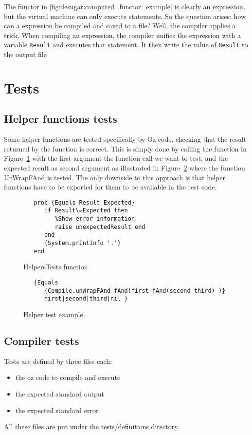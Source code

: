 \documentclass[a4paper]{memoir}
\begin{document}
The functor in \ref{fig:desugar:computed_functor_example} is clearly an
expression, but the virtual machine can only execute statements. So the question
arises: how can a expression be compiled and saved to a file? Well, the compiler 
applies a trick. When compiling an expression, the compiler unifies the
expression with a variable \lstinline!Result! and executes that statement.
It then write the value of \lstinline!Result! to the output file

\section{Tests}
\subsection{Helper functions tests}
Some helper functions are tested specifically by Oz code, checking that the result returned by the function is correct. This is simply done by calling the function in Figure~\ref{fig:helperstestsfunction} with the first argument the function call we want to test, and the expected result as second argument as illustrated in Figure~\ref{fig:helperstestsexample} where the function UnWrapFAnd is tested.
The only downside to this approach is that helper functions have to be exported for them to be available in the test code.

\begin{figure}
\begin{lstlisting}
   proc {Equals Result Expected}
      if Result\=Expected then
         %Show error information
         raise unexpectedResult end
      end
      {System.printInfo '.'}
   end
\end{lstlisting}
\caption{HelpersTests function}
\label{fig:helperstestsfunction}
\end{figure}

\begin{figure}
\begin{lstlisting}
   {Equals 
      {Compile.unWrapFAnd fAnd(first fAnd(second third) )}
      first|second|third|nil }
\end{lstlisting}
\caption{Helper test example}
\label{fig:helperstestsexample}
\end{figure}
\subsection{Compiler tests}
Tests are defined by three files each:
\begin{itemize}
  \item the oz code to compile and execute
  \item the expected standard output
  \item the expected standard error
\end{itemize}
All these files are put under the tests/definitions directory.
\end{document}
